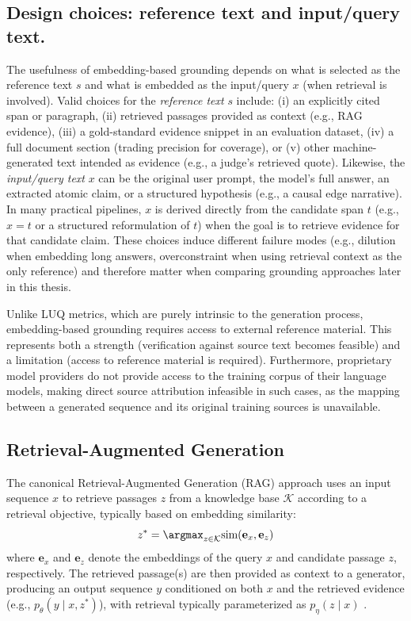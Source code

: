 \subsection{Design choices: reference text and input/query text.} The usefulness of embedding-based grounding depends on what is selected as the reference text $s$ and what is embedded as the input/query $x$ (when retrieval is involved). Valid choices for the \emph{reference text} $s$ include: (i) an explicitly cited span or paragraph, (ii) retrieved passages provided as context (e.g., RAG evidence), (iii) a gold-standard evidence snippet in an evaluation dataset, (iv) a full document section (trading precision for coverage), or (v) other machine-generated text intended as evidence (e.g., a judge's retrieved quote). Likewise, the \emph{input/query text} $x$ can be the original user prompt, the model's full answer, an extracted atomic claim, or a structured hypothesis (e.g., a causal edge narrative). In many practical pipelines, $x$ is derived directly from the candidate span $t$ (e.g., $x=t$ or a structured reformulation of $t$) when the goal is to retrieve evidence for that candidate claim. These choices induce different failure modes (e.g., dilution when embedding long answers, overconstraint when using retrieval context as the only reference) and therefore matter when comparing grounding approaches later in this thesis.

Unlike LUQ metrics, which are purely intrinsic to the generation process, embedding-based grounding requires access to external reference material. This represents both a strength (verification against source text becomes feasible) and a limitation (access to reference material is required). Furthermore, proprietary model providers do not provide access to the training corpus of their language models, making direct source attribution infeasible in such cases, as the mapping between a generated sequence and its original training sources is unavailable.

\subsection{Retrieval-Augmented Generation}

The canonical Retrieval-Augmented Generation (RAG) approach \citep{lewis2021retrievalaugmentedgenerationknowledgeintensivenlp} uses an input sequence $x$ to retrieve passages $z$ from a knowledge base $\mathcal{K}$ according to a retrieval objective, typically based on embedding similarity:
\begin{equation}
z^* = \argmax_{z \in \mathcal{K}} \text{sim}(\mathbf{e}_x, \mathbf{e}_z)
\end{equation}
where $\mathbf{e}_x$ and $\mathbf{e}_z$ denote the embeddings of the query $x$ and candidate passage $z$, respectively. The retrieved passage(s) are then provided as context to a generator, producing an output sequence $y$ conditioned on both $x$ and the retrieved evidence (e.g., $p_\theta(y \mid x, z^*)$), with retrieval typically parameterized as $p_\eta(z \mid x)$ \citep{lewis2021retrievalaugmentedgenerationknowledgeintensivenlp}.

